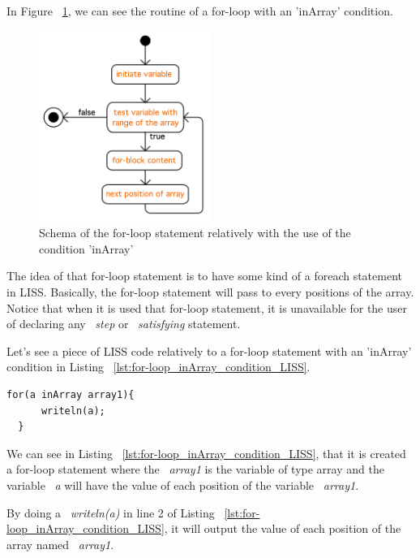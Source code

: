 \documentclass[
  oneside,
  11pt, a4paper,
  footinclude=true,
  headinclude=true,
  cleardoublepage=empty
]{scrbook}
\begin{document}
In Figure ~\ref{fig:for-loop_inArray}, we can see the routine of a for-loop with an 'inArray' condition.

\begin{figure}[h!]
  \centering
    \includegraphics[width=0.5\textwidth]{img/for-loop_inArray.png}
    \caption{Schema of the for-loop statement relatively with the use of the condition 'inArray'}
    \label{fig:for-loop_inArray}
\end{figure}

The idea of that for-loop statement is to have some kind of a foreach statement in LISS. Basically, the for-loop statement will pass to every positions of the array. Notice that when it is used that for-loop statement, it is unavailable for the user of declaring any ~\textit{step} or ~\textit{satisfying} statement.

Let's see a piece of LISS code relatively to a for-loop statement with an 'inArray' condition in Listing ~\ref{lst:for-loop_inArray_condition_LISS}.

\begin{lstlisting}[caption={Example of a for-loop statement with 'inArray' condition in LISS},label={lst:for-loop_inArray_condition_LISS}]
  for(a inArray array1){
      writeln(a);
  }
\end{lstlisting}

We can see in Listing ~\ref{lst:for-loop_inArray_condition_LISS}, that it is created a for-loop statement where the ~\textit{array1} is the variable of type array and the variable ~\textit{a} will have the value of each position of the variable ~\textit{array1}.

By doing a ~\textit{writeln(a)} in line 2 of Listing ~\ref{lst:for-loop_inArray_condition_LISS}, it will output the value of each position of the array named ~\textit{array1}.
\end{document}

